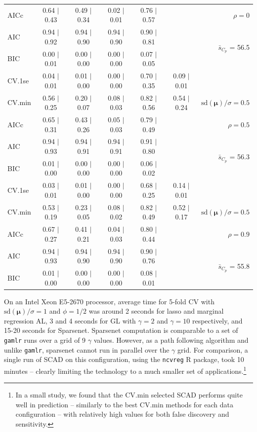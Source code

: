 \documentclass[12pt]{article}
\newcommand{\mr}[1]{\mathrm{#1}}
\newcommand{\bm}[1]{\mathbf{#1}}
\begin{document}
\begin{table}[p]
\begin{center}
\begin{tabular}{l*{5}{c}|r}
AICc & 0.64 $\mid$ 0.43 & 0.49 $\mid$ 0.34 & 0.02 $\mid$ 0.01 & 0.76 $\mid$ 0.57 & & $\rho=0$ \\
AIC & 0.94 $\mid$ 0.92 & 0.94 $\mid$ 0.90 & 0.94 $\mid$ 0.90 & 0.90 $\mid$ 0.81 & & \multirow{2}{*}{$\bar{s}_{C_p}$ = 56.5} \\
BIC & 0.00 $\mid$ 0.01 & 0.00 $\mid$ 0.00 & 0.00 $\mid$ 0.00 & 0.07 $\mid$ 0.05 & & \\
 \hline 
CV.1se & 0.04 $\mid$ 0.01 & 0.01 $\mid$ 0.00 & 0.00 $\mid$ 0.00 & 0.70 $\mid$ 0.35 & 0.09 $\mid$ 0.01 &\\
CV.min & 0.56 $\mid$ 0.25 & 0.20 $\mid$ 0.07 & 0.08 $\mid$ 0.03 & 0.82 $\mid$ 0.56 & 0.54 $\mid$ 0.24 &  $\mr{sd}(\bm{\mu})/\sigma=0.5$ \\
AICc & 0.65 $\mid$ 0.31 & 0.43 $\mid$ 0.26 & 0.05 $\mid$ 0.03 & 0.79 $\mid$ 0.49 & & $\rho=0.5$ \\
AIC & 0.94 $\mid$ 0.93 & 0.94 $\mid$ 0.91 & 0.94 $\mid$ 0.91 & 0.91 $\mid$ 0.80 & & \multirow{2}{*}{$\bar{s}_{C_p}$ = 56.3} \\
BIC & 0.01 $\mid$ 0.00 & 0.00 $\mid$ 0.00 & 0.00 $\mid$ 0.00 & 0.06 $\mid$ 0.02 & & \\
 \hline 
CV.1se & 0.03 $\mid$ 0.01 & 0.01 $\mid$ 0.00 & 0.00 $\mid$ 0.00 & 0.68 $\mid$ 0.25 & 0.14 $\mid$ 0.01 &\\
CV.min & 0.53 $\mid$ 0.19 & 0.23 $\mid$ 0.05 & 0.08 $\mid$ 0.02 & 0.82 $\mid$ 0.49 & 0.52 $\mid$ 0.17 &  $\mr{sd}(\bm{\mu})/\sigma=0.5$ \\
AICc & 0.67 $\mid$ 0.27 & 0.41 $\mid$ 0.21 & 0.04 $\mid$ 0.03 & 0.80 $\mid$ 0.44 & & $\rho=0.9$ \\
AIC & 0.94 $\mid$ 0.93 & 0.94 $\mid$ 0.90 & 0.94 $\mid$ 0.90 & 0.90 $\mid$ 0.76 & & \multirow{2}{*}{$\bar{s}_{C_p}$ = 55.8} \\
BIC & 0.01 $\mid$ 0.00 & 0.00 $\mid$ 0.00 & 0.00 $\mid$ 0.00 & 0.08 $\mid$ 0.01 & & \\
 \hline 
 \end{tabular}
\end{center}
\vspace{-1cm}
\end{table}

On an Intel Xeon E5-2670 processor, average time for 5-fold CV with $\mr{sd}(\bm{\mu})/\sigma=1$ and $\phi=1/2$ was around 2 seconds for lasso and marginal regression AL, 3 and 4 seconds for GL with $\gamma=2$ and $\gamma=10$ respectively, and 15-20 seconds for Sparsenet. Sparsenet computation is comparable to a set of {\tt gamlr} runs over a grid of 9 $\gamma$ values.  However, as a path following algorithm and unlike {\tt gamlr}, sparsenet cannot run in parallel over the $\gamma$ grid.   For comparison,  a single run of SCAD on this configuration, using the {\tt ncvreg} R package, took 10 minutes -- clearly limiting the technology to a much smaller set of  applications.\footnote{In a small study, we found that the CV.min selected SCAD performs quite well in prediction --  similarly to the best CV.min methods for each data configuration -- with relatively high values for both false discovery and sensitivity. }
\end{document}
